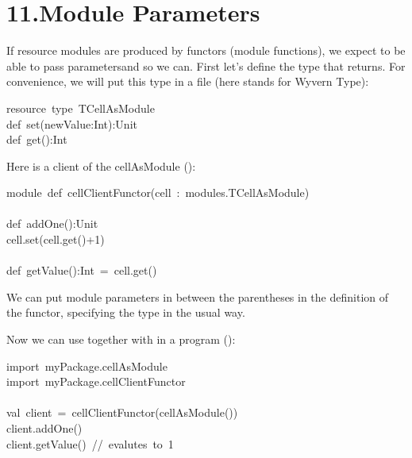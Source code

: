 \documentclass{article}
\begin{document}
\section{11.\hspace*{0.5em}Module Parameters}\label{sec-module-parameters}%

\noindent{}If resource modules are produced by functors (module functions), we
expect to be able to pass
parameters\textendash{}and so we can.  First let's define the type that
 returns.  For convenience, we will put this type in a
file  (here  stands for Wyvern Type):%
\begin{mdpre}%
\noindent resource~type~TCellAsModule\\
def~set(newValue:Int):Unit\\
def~get():Int%
\end{mdpre}\noindent{}Here is a client of the cellAsModule ():
\begin{mdpre}%
\noindent module~def~cellClientFunctor(cell~:~modules.TCellAsModule)\\
\\
def~addOne():Unit\\
cell.set(cell.get()+1)\\
\\
def~getValue():Int~=~cell.get()\\
\end{mdpre}\noindent{}We can put module parameters in between the parentheses in the definition
of the functor, specifying the type in the usual way.

Now we can use  together with  in a program ():%
\begin{mdpre}%
\noindent import~myPackage.cellAsModule\\
import~myPackage.cellClientFunctor\\
\\
val~client~=~cellClientFunctor(cellAsModule())\\
client.addOne()\\
client.getValue()~//~evalutes~to~1%
\end{mdpre}
\end{document}
